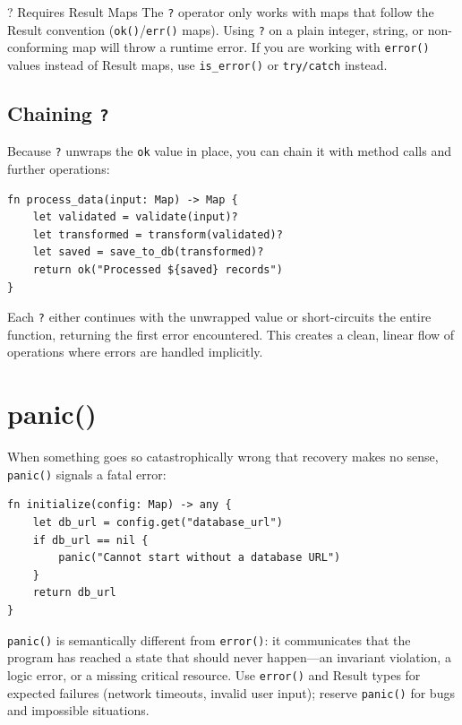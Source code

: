 \begin{warnbox}{? Requires Result Maps}
The \lstinline|?| operator only works with maps that follow the Result convention (\lstinline|ok()|/\lstinline|err()| maps). Using \lstinline|?| on a plain integer, string, or non-conforming map will throw a runtime error. If you are working with \lstinline|error()| values instead of Result maps, use \lstinline|is_error()| or \lstinline|try/catch| instead.
\end{warnbox}

\subsection{Chaining \texttt{?}}\label{sec:chaining-question}

Because \lstinline|?| unwraps the \lstinline|ok| value in place, you can chain it with method calls and further operations:

\begin{lstlisting}[language=Lattice, caption={Chaining the ? operator}]
fn process_data(input: Map) -> Map {
    let validated = validate(input)?
    let transformed = transform(validated)?
    let saved = save_to_db(transformed)?
    return ok("Processed ${saved} records")
}
\end{lstlisting}

Each \lstinline|?| either continues with the unwrapped value or short-circuits the entire function, returning the first error encountered. This creates a clean, linear flow of operations where errors are handled implicitly.

\section{panic()}\label{sec:panic}

When something goes so catastrophically wrong that recovery makes no sense, \lstinline|panic()| signals a fatal error:

\begin{lstlisting}[language=Lattice, caption={Using panic() for unrecoverable errors}]
fn initialize(config: Map) -> any {
    let db_url = config.get("database_url")
    if db_url == nil {
        panic("Cannot start without a database URL")
    }
    return db_url
}
\end{lstlisting}

\lstinline|panic()| is semantically different from \lstinline|error()|: it communicates that the program has reached a state that should never happen---an invariant violation, a logic error, or a missing critical resource. Use \lstinline|error()| and Result types for expected failures (network timeouts, invalid user input); reserve \lstinline|panic()| for bugs and impossible situations.

